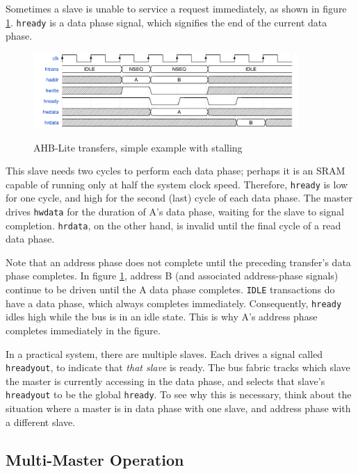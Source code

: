\documentclass[notitlepage]{article}
\begin{document}
Sometimes a slave is unable to service a request immediately, as shown in figure \ref{diagram:ahbl_basic_stall}. {\tt hready} is a data phase signal, which signifies the end of the current data phase.

\begin{figure}[H]
\centering
\caption{AHB-Lite transfers, simple example with stalling}
\includegraphics[width=0.9\textwidth]{waves/ahbl_basic_stall.pdf}
\label{diagram:ahbl_basic_stall}
\end{figure}

This slave needs two cycles to perform each data phase; perhaps it is an SRAM capable of running only at half the system clock speed. Therefore, {\tt hready} is low for one cycle, and high for the second (last) cycle of each data phase. The master drives {\tt hwdata} for the duration of A's data phase, waiting for the slave to signal completion. {\tt hrdata}, on the other hand, is invalid until the final cycle of a read data phase.

Note that an address phase does not complete until the preceding transfer's data phase completes. In figure \ref{diagram:ahbl_basic_stall}, address B (and associated address-phase signals) continue to be driven until the A data phase completes. {\tt IDLE} transactions do have a data phase, which always completes immediately. Consequently, {\tt hready} idles high while the bus is in an idle state. This is why A's address phase completes immediately in the figure.

In a practical system, there are multiple slaves. Each drives a signal called {\tt hreadyout}, to indicate that {\it that slave} is ready. The bus fabric tracks which slave the master is currently accessing in the data phase, and selects that slave's {\tt hreadyout} to be the global {\tt hready}. To see why this is necessary, think about the situation where a master is in data phase with one slave, and address phase with a different slave.

\subsection{Multi-Master Operation}
\end{document}
